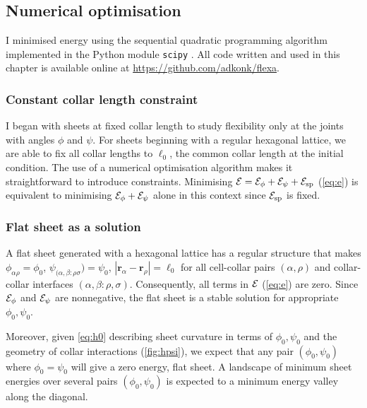 \subsection{Numerical optimisation}

I minimised energy using the sequential quadratic programming algorithm implemented in the Python module \texttt{scipy} \citep{kraft1994}.
All code written and used in this chapter is available online at \url{https://github.com/adkonk/flexa}.

\subsubsection{Constant collar length constraint}

I began with sheets at fixed collar length to study flexibility only at the joints with angles $\phi$ and $\psi$.
For sheets beginning with a regular hexagonal lattice, we are able to fix all collar lengths to $\ell_0$, the common collar length at the initial condition. 
The use of a numerical optimisation algorithm makes it straightforward to introduce constraints. 
Minimising $\mathcal{E} = \mathcal{E}_\phi + \mathcal{E}_\psi + \mathcal{E}_{\text{sp}}$ (\cref{eq:e}) is equivalent to minimising $\mathcal{E}_\phi + \mathcal{E}_\psi$ alone in this context since $\mathcal{E}_{\text{sp}}$ is fixed.

\subsubsection{Flat sheet as a solution} \label{subsubsec:flat}

A flat sheet generated with a hexagonal lattice has a regular structure that makes $\phi_{\alpha\rho} = \phi_0$, $\psi_{(\alpha,\beta:\rho\sigma}) = \psi_0$, $|\bm{r}_\alpha - \bm{r}_\rho| = \ell_0$ for all cell-collar pairs $(\alpha,\rho)$ and collar-collar interfaces $(\alpha,\beta:\rho,\sigma)$. 
Consequently, all terms in $\mathcal{E}$ (\cref{eq:e}) are zero.
Since $\mathcal{E}_\phi$ and $\mathcal{E}_\psi$ are nonnegative, the flat sheet is a stable solution for appropriate $\phi_0, \psi_0$. 

Moreover, given \cref{eq:h0} describing sheet curvature in terms of $\phi_0, \psi_0$ and the geometry of collar interactions (\cref{fig:hpsi}), we expect that any pair $(\phi_0, \psi_0)$ where $\phi_0 = \psi_0$ will give a zero energy, flat sheet.
A landscape of minimum sheet energies over several pairs $(\phi_0, \psi_0)$ is expected to a minimum energy valley along the diagonal.

% 
% 
% 
% 
% 

